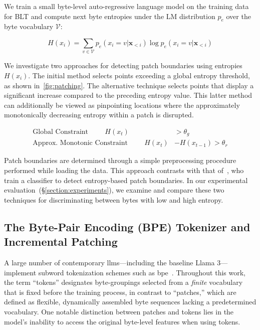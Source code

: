 We train a small byte-level auto-regressive language model on the training data for {\textsc BLT} and compute next byte entropies under the LM distribution $p_{e}$ over the byte vocabulary $\mathcal{V}$:

\begin{equation}
H(x_i) = \sum_{v \in \mathcal{V}} p_{e}(x_i=v|\pmb{x}_{<i}) \log p_{e}(x_i=v|\pmb{x}_{<i})
\end{equation}

We investigate two approaches for detecting patch boundaries using entropies $H(x_i)$. The initial method selects points exceeding a global entropy threshold, as shown in~\autoref{fig:patching}. The alternative technique selects points that display a significant increase compared to the preceding entropy value. This latter method can additionally be viewed as pinpointing locations where the approximately monotonically decreasing entropy within a patch is disrupted.

\begin{align*}
    \text{Global Constraint}\hspace{1cm}H(x_t)& > \theta_g\\
    \text{Approx. Monotonic Constraint}\hspace{1cm}H(x_t)& - H(x_{t-1}) > \theta_r
\end{align*}

Patch boundaries are determined through a simple preprocessing procedure performed while loading the data. This approach contrasts with that of~\citet{nawrot-etal-2023-efficient}, who train a classifier to detect entropy-based patch boundaries. In our experimental evaluation~(\S\ref{section:experiments}), we examine and compare these two techniques for discriminating between bytes with low and high entropy.

\subsection{The Byte-Pair Encoding (BPE) Tokenizer and Incremental Patching}
\label{section:incremental-patching}
\label{section:bpe-patch}

A large number of contemporary llms—including the baseline Llama 3—implement subword tokenization schemes such as bpe~\citep{gage1994new, sennrich-etal-2016-neural}. Throughout this work, the term ``tokens'' designates byte-groupings selected from a \textit{finite} vocabulary that is fixed before the training process, in contrast to ``patches,'' which are defined as flexible, dynamically assembled byte sequences lacking a predetermined vocabulary. One notable distinction between patches and tokens lies in the model’s inability to access the original byte-level features when using tokens.

